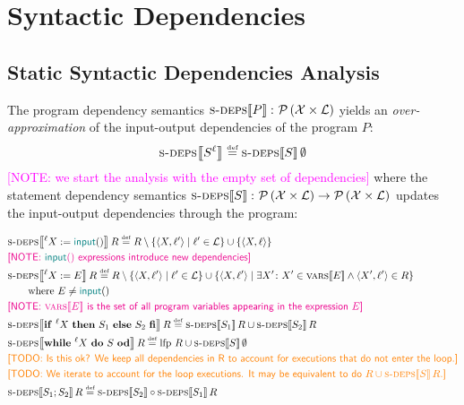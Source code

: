 \documentclass{article}
\newcommand{\defined}{\ensuremath{\stackrel{\mbox{\tiny def}}{=}}\xspace} %
\newcommand{\vars}{\ensuremath{\mathcal{X}}\xspace} %
\newcommand{\ipt}{\ensuremath{\mathbf{\mathsf{\color{teal}input}}()}\xspace} %
\newcommand{\powerset}[1]{\ensuremath{\mathcal{P}\left(#1\right)}\xspace} %
\newcommand{\tuple}[2]{\ensuremath{\langle #1, #2 \rangle}\xspace} %
\newcommand{\lfp}{\ensuremath{\mathrm{lfp}}\xspace} %
\newcommand{\labels}{\ensuremath{\mathcal{L}}\xspace} %
\newcommand{\semantics}[1]{\ensuremath{\left\llbracket #1 \right\rrbracket}\xspace} %
\newcommand{\sdeps}[1]{\ensuremath{\textsc{s-deps}\!\semantics{#1}}\xspace} %
\newcommand{\ids}[1]{\ensuremath{\textsc{vars}\!\semantics{#1}}\xspace} %
\newcommand{\irem}[3]{{\noindent\textcolor{#1}{\textsf{[#2: 
#3]}}}}
\newcommand{\todo}[1]{\irem{orange}{TODO}{#1}}
\newcommand{\note}[1]{\irem{magenta}{NOTE}{#1}}
\begin{document}
\section*{Syntactic Dependencies}

\subsection*{Static Syntactic Dependencies Analysis}

The program dependency semantics $\sdeps{P} \colon \powerset{\vars \times \labels}$ yields an \emph{over-approximation} of the input-output dependencies of the program $P$:
\begin{equation*}
\sdeps{S^\ell{}} \defined \sdeps{S}\emptyset
\end{equation*}
\note{we start the analysis with the empty set of dependencies}
where the statement dependency semantics $\sdeps{S} \colon \powerset{\vars \times \labels} \rightarrow  \powerset{\vars \times \labels}$ updates the input-output dependencies through the program:

	\begin{align*}
	&\sdeps{^\ell{}X := \ipt}R \defined R \setminus \{ \tuple{X}{\ell{}'} \mid \ell{}' \in \labels \} \cup \{ \tuple{X}{\ell{}} \} 
	\\
	&\mbox{\note{\ipt expressions introduce new dependencies}} \\
	&\sdeps{^\ell{}X := E}R \defined R \setminus \{ \tuple{X}{\ell{}'} \mid \ell{}' \in \labels \} \cup \{ \tuple{X}{\ell{}'} \mid \exists X'\colon X' \in \ids{E} \land \tuple{X'}{\ell{}'} \in R \} \\
	&\qquad\mbox{where $E \not= \ipt$} \\
	&\mbox{\note{\ids{E} is the set of all program variables appearing in the expression $E$}} \\
%
	&\sdeps{\mathsf{\mathbf{if}}~^\ell{}X~\mathsf{\mathbf{then}}~S_1~\mathsf{\mathbf{else}}~S_2~\mathsf{\mathbf{fi}}}R
	 \defined \sdeps{S_1}R \cup \sdeps{S_2}R \\ 
%
&\sdeps{\mathsf{\mathbf{while}}~^\ell{}X~\mathsf{\mathbf{do}}~S~\mathsf{\mathbf{od}}}R
\defined \lfp~R \cup \sdeps{S}\emptyset  \\
&\todo{Is this ok? We keep all dependencies in R to account for executions that do not enter the loop.} \\
&\todo{We iterate to account for the loop executions. It may be equivalent to do $R \cup \sdeps{S}R$.} \\
%
&\sdeps{S_1; S_2}R \defined \sdeps{S_2} \circ 
\sdeps{S_1}R
	\end{align*}
\end{document}
